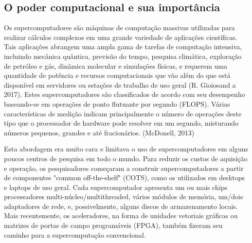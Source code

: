 \documentclass[11pt, letterpaper, portuguese]{article}
\begin{document}
   
\subsection{O poder computacional e sua importância}
    
\par{Os supercomputadores são máquinas de computação massivas utilizadas para realizar cálculos complexos em uma grande variedade de aplicações científicas. Tais aplicações abrangem uma ampla gama de tarefas de computação intensiva, incluindo mecânica quântica, previsão do tempo, pesquisa climática, exploração de petróleo e gás, dinâmica molecular e simulações físicas, e requerem uma quantidade de potência e recursos computacionais que vão além do que está disponível em servidores ou estações de trabalho de uso geral \cite{}(R. Gioiosand a 2017). Estes supercomputadores são classificados de acordo com seu desempenho baseando-se em operações de ponto flutuante por segundo (FLOPS). Várias características de medição indicam principalmente o número de operações deste tipo que o processador de hardware pode resolver em um segundo, misturando números pequenos, grandes e até fracionários. (McDonell, 2013)} 

\par{Esta abordagem era muito cara e limitava o uso de supercomputadores em alguns poucos centros de pesquisa em todo o mundo. Para reduzir os custos de aquisição e operação, os pesquisadores começaram a construir supercomputadores a partir de componentes "common off-the-shelf" (COTS), como os utilizados em desktops e laptops de uso geral. Cada supercomputador apresenta um ou mais chips processadores multi-núcleo/multithreaded, vários módulos de memória, um/dois adaptadores de rede, e, possivelmente, alguns discos de armazenamento locais. Mais recentemente, os aceleradores, na forma de unidades vetoriais gráficas ou matrizes de portas de campo programáveis (FPGA), também fizeram seu caminho para a supercomputação convencional. }
\end{document}
